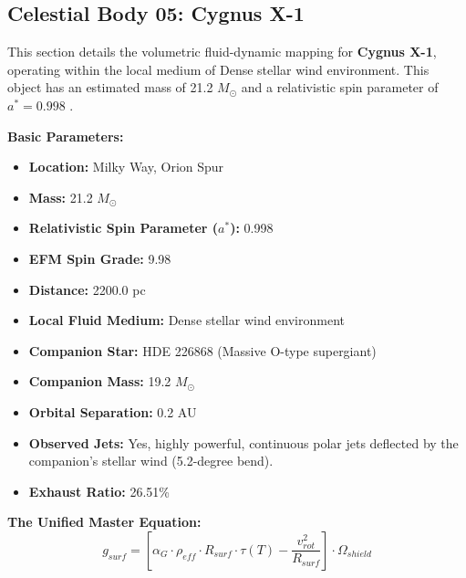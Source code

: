 \documentclass[11pt, a4paper]{article}
\begin{document}
\clearpage
\subsection{Celestial Body 05: Cygnus X-1}
This section details the volumetric fluid-dynamic mapping for \textbf{Cygnus X-1}, operating within the local medium of Dense stellar wind environment. This object has an estimated mass of 21.2 $M_{\odot}$ and a relativistic spin parameter of $a^* = 0.998$ \cite{prabu2026, simbad}.

\vspace{0.5em}
\noindent \textbf{Basic Parameters:}
\begin{itemize}
  \item \textbf{Location:} Milky Way, Orion Spur
  \item \textbf{Mass:} 21.2 $M_{\odot}$
  \item \textbf{Relativistic Spin Parameter ($a^*$):} 0.998
  \item \textbf{EFM Spin Grade:} 9.98
  \item \textbf{Distance:} 2200.0 pc
  \item \textbf{Local Fluid Medium:} Dense stellar wind environment
  \item \textbf{Companion Star:} HDE 226868 (Massive O-type supergiant)
  \item \textbf{Companion Mass:} 19.2 $M_{\odot}$
  \item \textbf{Orbital Separation:} 0.2 AU
  \item \textbf{Observed Jets:} Yes, highly powerful, continuous polar jets deflected by the companion's stellar wind (5.2-degree bend).
  \item \textbf{Exhaust Ratio:} 26.51\%
\end{itemize}

\vspace{0.5em}
\noindent \textbf{The Unified Master Equation:}
$$ g_{surf} = \left[ \alpha_G \cdot \rho_{eff} \cdot R_{surf} \cdot \tau(T) - \frac{v_{rot}^2}{R_{surf}} \right] \cdot \Omega_{shield} $$
\end{document}
